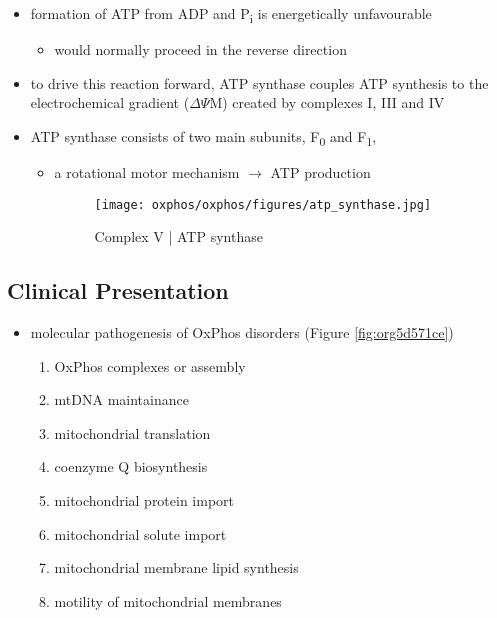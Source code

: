 \documentclass{scrartcl}
\begin{document}
\begin{enumerate}
{\small{}}

\begin{itemize}
\item formation of ATP from ADP and P\textsubscript{i} is energetically unfavourable
\begin{itemize}
\item would normally proceed in the reverse direction
\end{itemize}

\item to drive this reaction forward, ATP synthase couples ATP synthesis
to the electrochemical gradient (\(\Delta \Psi\)M) created by complexes
I, III and IV
\item ATP synthase consists of two main subunits, F\textsubscript{0} and F\textsubscript{1},
\begin{itemize}
\item a rotational motor mechanism \(\to\) ATP production

\begin{figure}[htbp]
\centering
\texttt{[image: oxphos/oxphos/figures/atp\_synthase.jpg]}
\caption{\label{fig:org2febf88}Complex V | ATP synthase}
\end{figure}
\end{itemize}
\end{itemize}
\end{enumerate}

\subsection{Clinical Presentation}
\label{sec:org980b7bc}
\begin{itemize}
\item molecular pathogenesis of OxPhos disorders (Figure \ref{fig:org5d571ce})
\begin{enumerate}
\item OxPhos complexes or assembly
\item mtDNA maintainance
\item mitochondrial translation
\item coenzyme Q biosynthesis
\item mitochondrial protein import
\item mitochondrial solute import
\item mitochondrial membrane lipid synthesis
\item motility of mitochondrial membranes
\end{enumerate}
\end{itemize}
\end{document}
